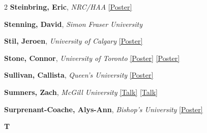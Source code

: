 \begin{small}
\begin{multicols}{2}
\textbf{Steinbring, Eric}, {\footnotesize\textit{NRC/HAA}} \hyperref[poster-abstract-page-talk-238]{\scriptsize\textcolor{cascateal}{[Poster]}}\par
\textbf{Stenning, David}, {\footnotesize\textit{Simon Fraser University}}\par
\textbf{Stil, Jeroen}, {\footnotesize\textit{University of Calgary}} \hyperref[poster-abstract-page-talk-116]{\scriptsize\textcolor{cascateal}{[Poster]}}\par
\textbf{Stone, Connor}, {\footnotesize\textit{University of Toronto}} \hyperref[poster-abstract-page-talk-25]{\scriptsize\textcolor{cascateal}{[Poster]}} \hyperref[poster-abstract-page-talk-27]{\scriptsize\textcolor{cascateal}{[Poster]}}\par
\textbf{Sullivan, Callista}, {\footnotesize\textit{Queen's University}} \hyperref[poster-abstract-page-talk-229]{\scriptsize\textcolor{cascateal}{[Poster]}}\par
\textbf{Sumners, Zach}, {\footnotesize\textit{McGill University}} \hyperref[abstract-page-talk-124]{\scriptsize\textcolor{cascablue}{[Talk]}} \hyperref[abstract-page-talk-124]{\scriptsize\textcolor{cascablue}{[Talk]}}\par
\textbf{Surprenant-Coache, Alys-Ann}, {\footnotesize\textit{Bishop's University}} \hyperref[poster-abstract-page-talk-183]{\scriptsize\textcolor{cascateal}{[Poster]}}\par

{\sffamily\bfseries\color{cascablue}\large T}\\[2pt]


\end{multicols}
\end{small}
